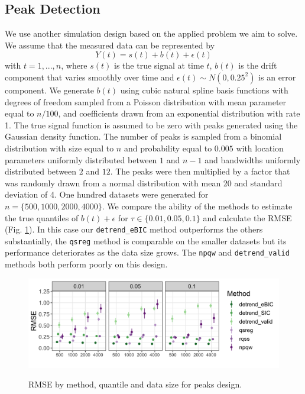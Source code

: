 \documentclass[12pt]{article}
\begin{document}
	\subsection{Peak Detection}
	We use another simulation design based on the applied problem we aim to solve. We assume that the measured data can be represented by 
	\begin{equation}
	Y(t) = s(t) + b(t) + \epsilon(t)
	\end{equation} 
	with $t = 1, ..., n$, where $s(t)$ is the true signal at time $t$, $b(t)$ is the drift component that varies smoothly over time and $\epsilon(t) \sim N(0, 0.25^2)$ is an error component. We generate $b(t)$ using cubic natural spline basis functions with degrees of freedom sampled from a Poisson distribution with mean parameter equal to $n/100$,  and coefficients drawn from an exponential distribution with rate 1. The true signal function is assumed to be zero with peaks generated using the Gaussian density function. The number of peaks is sampled from a binomial distribution with size equal to $n$ and probability equal to $0.005$ with location parameters uniformly distributed between $1$ and $n-1$ and bandwidths uniformly distributed between $2$ and $12$. The peaks were then multiplied by a factor that was randomly drawn from a normal distribution with mean 20 and standard deviation of 4. One hundred datasets were generated for $n=\{500, 1000, 2000, 4000\}$. We compare the ability of the methods to estimate the true quantiles of $b(t) + \epsilon$  for $\tau \in \{0.01, 0.05, 0.1\}$ and calculate the RMSE (Fig. \ref{fig:peaks_rmse}). In this case our \texttt{detrend\_eBIC} method outperforms the others substantially, the \texttt{qsreg} method is comparable on the smaller datasets but its performance deteriorates as the data size grows. The \texttt{npqw} and \texttt{detrend\_valid} methods both perform poorly on this design. 
	
	\begin{figure}
		\caption{RMSE by method, quantile and data size for peaks design.}
		\includegraphics[width = \linewidth]{Figures/peaks_mse.png}	
		\label{fig:peaks_rmse}
	\end{figure}
	
\end{document}

